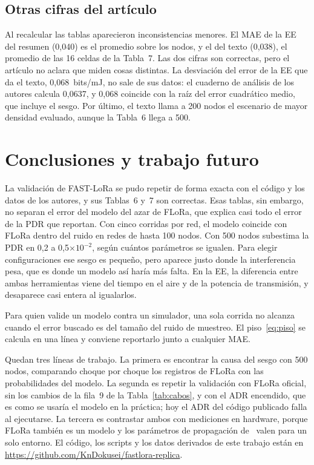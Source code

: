 \documentclass[conference,a4paper]{IEEEtran}
\begin{document}
\subsection{Otras cifras del artículo}

Al recalcular las tablas aparecieron inconsistencias menores. El MAE de la EE del resumen (0,040) es el promedio sobre los nodos, y el del texto (0,038), el promedio de las 16 celdas de la Tabla~7. Las dos cifras son correctas, pero el artículo no aclara que miden cosas distintas. La desviación del error de la EE que da el texto, 0,068~bits/mJ, no sale de sus datos: el cuaderno de análisis de los autores calcula 0,0637, y 0,068 coincide con la raíz del error cuadrático medio, que incluye el sesgo. Por último, el texto llama a 200 nodos el escenario de mayor densidad evaluado, aunque la Tabla~6 llega a 500.

\section{Conclusiones y trabajo futuro}

La validación de FAST-LoRa se pudo repetir de forma exacta con el código y los datos de los autores, y sus Tablas~6 y~7 son correctas. Esas tablas, sin embargo, no separan el error del modelo del azar de FLoRa, que explica casi todo el error de la PDR que reportan. Con cinco corridas por red, el modelo coincide con FLoRa dentro del ruido en redes de hasta 100 nodos. Con 500 nodos subestima la PDR en 0,2 a 0,5$\times10^{-2}$, según cuántos parámetros se igualen. Para elegir configuraciones ese sesgo es pequeño, pero aparece justo donde la interferencia pesa, que es donde un modelo así haría más falta. En la EE, la diferencia entre ambas herramientas viene del tiempo en el aire y de la potencia de transmisión, y desaparece casi entera al igualarlos.

Para quien valide un modelo contra un simulador, una sola corrida no alcanza cuando el error buscado es del tamaño del ruido de muestreo. El piso~\eqref{eq:piso} se calcula en una línea y conviene reportarlo junto a cualquier MAE.

Quedan tres líneas de trabajo. La primera es encontrar la causa del sesgo con 500 nodos, comparando choque por choque los registros de FLoRa con las probabilidades del modelo. La segunda es repetir la validación con FLoRa oficial, sin los cambios de la fila~9 de la Tabla~\ref{tab:cabos}, y con el ADR encendido, que es como se usaría el modelo en la práctica; hoy el ADR del código publicado falla al ejecutarse. La tercera es contrastar ambos con mediciones en hardware, porque FLoRa también es un modelo y los parámetros de propagación de~\cite{bor} valen para un solo entorno. El código, los scripts y los datos derivados de este trabajo están en \url{https://github.com/KnDokusei/fastlora-replica}.
\end{document}
